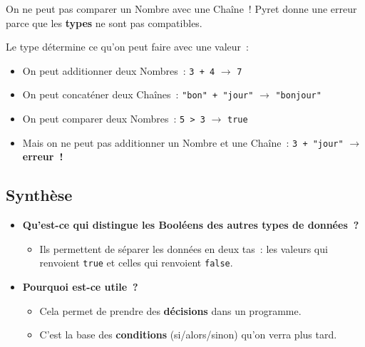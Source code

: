 \documentclass[12pt,a4paper]{article}
\newcommand{\pyret}[1]{\texttt{#1}}
\begin{document}
\begin{keypointbox}
  On ne peut pas comparer un Nombre avec une Chaîne~! Pyret donne une erreur parce que les \textbf{types} ne sont pas compatibles.

  Le type détermine ce qu'on peut faire avec une valeur~:
  \begin{itemize}
    \item On peut additionner deux Nombres~: \pyret{3 + 4} $\rightarrow$ \texttt{7}
    \item On peut concaténer deux Chaînes~: \pyret{"bon" + "jour"} $\rightarrow$ \texttt{"bonjour"}
    \item On peut comparer deux Nombres~: \pyret{5 > 3} $\rightarrow$ \texttt{true}
    \item Mais on ne peut pas additionner un Nombre et une Chaîne~: \pyret{3 + "jour"} $\rightarrow$ \textbf{erreur~!}
  \end{itemize}
\end{keypointbox}

\subsection{Synthèse}

\begin{thinkbox}
  \begin{itemize}
    \item \textbf{Qu'est-ce qui distingue les Booléens des autres types de données~?}
    \begin{itemize}
      \item Ils permettent de séparer les données en deux tas~: les valeurs qui renvoient \texttt{true} et celles qui renvoient \texttt{false}.
    \end{itemize}
    \item \textbf{Pourquoi est-ce utile~?}
    \begin{itemize}
      \item Cela permet de prendre des \textbf{décisions} dans un programme.
      \item C'est la base des \textbf{conditions} (si/alors/sinon) qu'on verra plus tard.
    \end{itemize}
  \end{itemize}
\end{thinkbox}

\newpage

\end{document}
